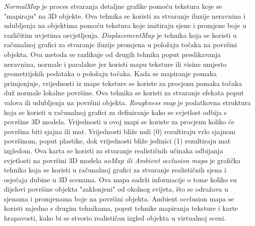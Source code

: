 \documentclass[a4paper,12pt]{article}
\begin{document}
\textit{NormalMap} je proces stvaranja detaljne grafike pomoću tekstura koje se "mapiraju" na 3D objekte. Ova tehnika se koristi za stvaranje iluzije neravnina i udubljenja na objektima pomoću tekstura koje imitiraju sjene i promjene boje u različitim uvjetima osvjetljenja.
\newline \textit{DisplacementMap} je tehnika koja se koristi u računalnoj grafici za stvaranje iluzije promjena u položaju točaka na površini objekta. Ova metoda se razlikuje od drugih tehnika poput preslikavanja neravnina, normale i paralakse jer koristi mapu teksture ili visine
umjesto geometrijskih podataka o položaju točaka. Kada se mapiranje pomaka primjenjuje, vrijednosti iz mape teksture se koriste za procjenu pomaka točaka duž normale lokalne površine. Ova tehnika se koristi za stvaranje efekata poput valova ili udubljenja na površini objekta.
\pagebreak
\textit{Roughness map} je podatkovna struktura koja se koristi u računalnoj grafici za definiranje kako se svjetlost odbija s površine 3D modela. Vrijednosti u ovoj mapi se koriste za procjenu koliko će površina biti sjajna ili mat. Vrijednosti bliže nuli (0) rezultiraju vrlo sjajnom površinom, 
poput plastike, dok vrijednosti bliže jedinici (1) rezultiraju mat izgledom. Ova karta se koristi za stvaranje realističnih učinaka odbijanja svjetlosti na površini 3D modela
\newline \textit{aoMap ili Ambient occlusion mapa} je grafička tehnika koja se koristi u računalnoj grafici za stvaranje realističnih sjena i osjećaja dubine u 3D scenama. Ova mapa sadrži informacije o tome koliko su dijelovi površine objekta "zaklonjeni" od okolnog svijeta, što se odražava u sjenama i promjenama boje na površini objekta. 
Ambient occlusion mapa se koristi zajedno s drugim tehnikama, poput tehnike mapiranja teksture i karte hrapavosti, kako bi se stvorio realističan izgled objekta u virtualnoj sceni.
\end{document}
